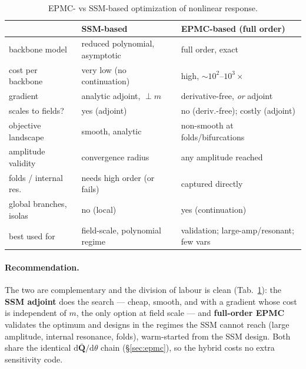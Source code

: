 \documentclass[11pt]{article}
\newcommand{\dd}{\mathrm{d}}
\begin{document}
\begin{table}[t]
\centering\footnotesize
\caption{EPMC- vs SSM-based optimization of nonlinear response.}
\label{tab:prosncons}
\begin{tabular}{@{}lll@{}}
\toprule
& \textbf{SSM-based} & \textbf{EPMC-based (full order)}\\ \midrule
backbone model         & reduced polynomial, asymptotic     & full order, exact\\
cost per backbone      & very low (no continuation)         & high, $\sim\!10^{2}$--$10^{3}\times$\\
gradient               & analytic adjoint, $\perp m$         & derivative-free, \emph{or} adjoint\\
scales to fields?      & yes (adjoint)                       & no (deriv.-free); costly (adjoint)\\
objective landscape    & smooth, analytic                    & non-smooth at folds/bifurcations\\
amplitude validity     & convergence radius                  & any amplitude reached\\
folds / internal res.  & needs high order (or fails)         & captured directly\\
global branches, isolas & no (local)                         & yes (continuation)\\
best used for          & field-scale, polynomial regime      & validation; large-amp/resonant; few vars\\
\bottomrule
\end{tabular}
\end{table}

\paragraph{Recommendation.}
The two are complementary and the division of labour is clean (Tab.~\ref{tab:prosncons}):
the \textbf{SSM adjoint} does the search --- cheap, smooth, and with a gradient whose
cost is independent of $m$, the only option at field scale --- and \textbf{full-order
EPMC} validates the optimum and designs in the regimes the SSM cannot reach
(large amplitude, internal resonance, folds), warm-started from the SSM design. Both
share the identical $\dd\bar{\bm Q}/\dd\theta$ chain (\S\ref{sec:epmc}), so the hybrid
costs no extra sensitivity code.
\end{document}
